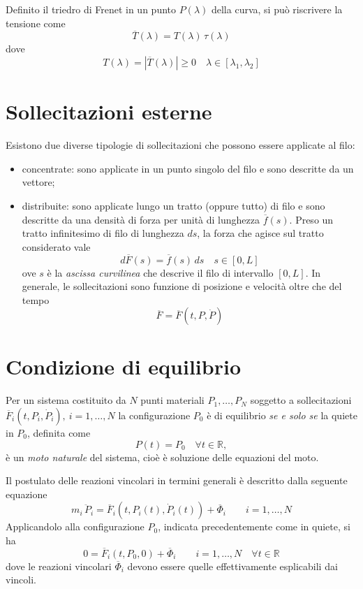 Definito il triedro di Frenet in un punto $P(\lambda)$ della curva, si può riscrivere la tensione come
\[
	\overline{T}(\lambda) = T(\lambda)\,\hat{\tau}(\lambda)
\]
dove
\[
T(\lambda) = \left|\overline{T}(\lambda)\right|\geq 0 \quad \lambda\in[\lambda_1, \lambda_2]
\]

\section{Sollecitazioni esterne}
Esistono due diverse tipologie di sollecitazioni che possono essere applicate al filo:
\begin{itemize}
	\item concentrate: sono applicate in un punto singolo del filo e sono descritte da un vettore;
	\item distribuite: sono applicate lungo un tratto (oppure tutto) di filo e sono descritte da una densità di forza per unità di lunghezza $\overline{f}(s)$. Preso un tratto infinitesimo di filo di lunghezza $ds$, la forza che agisce sul tratto considerato vale
	\[
		d\overline{F}(s) = \overline{f}(s)\,ds \quad s\in[0,L]
	\]
	ove $s$ è la \emph{ascissa curvilinea} che descrive il filo di intervallo $[0,L]$.
	In generale, le sollecitazioni sono funzione di posizione e velocità oltre che del tempo
	\[
	\overline{F} = \overline{F}(t, P, \dot{P})
	\]
\end{itemize}

\section{Condizione di equilibrio}
Per un sistema costituito da $N$ punti materiali ${P_1, \dots, P_N}$ soggetto a sollecitazioni $\overline{F}_i (t, P_i, \dot{P}_i),~ i=1,\dots,N$ la configurazione $P_0$ è di equilibrio \emph{se e solo se} la quiete in $P_0$, definita come
\[
P(t) = P_0\quad \forall t\in\mathbb{R},
\]
è un \emph{moto naturale} del sistema, cioè è soluzione delle equazioni del moto.

Il postulato delle reazioni vincolari in termini generali è descritto dalla seguente equazione
\[
m_i\,\ddot{P}_i = \overline{F}_i(t,P_i(t), \dot{P}_i(t)) + \overline{\Phi}_i\qquad i=1,\dots,N
\]
Applicandolo alla configurazione $P_0$, indicata precedentemente come in quiete, si ha
\begin{equation}
	\label{eq:equilibrio_p0}
	0 = \overline{F}_i (t, P_0, 0) + \overline{\Phi}_i\qquad i = 1,\dots, N\quad\forall t\in\mathbb{R}
\end{equation}
dove le reazioni vincolari $\overline{\Phi}_i$ devono essere quelle effettivamente esplicabili dai vincoli.

